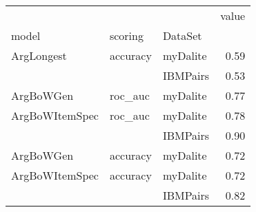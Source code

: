 \begin{tabular}{lllr}
\toprule
               &          &          &  value \\
model & scoring & DataSet &        \\
\midrule
ArgLongest & accuracy & myDalite &   0.59 \\
               &          & IBMPairs &   0.53 \\
ArgBoWGen & roc\_auc & myDalite &   0.77 \\
ArgBoWItemSpec & roc\_auc & myDalite &   0.78 \\
               &          & IBMPairs &   0.90 \\
ArgBoWGen & accuracy & myDalite &   0.72 \\
ArgBoWItemSpec & accuracy & myDalite &   0.72 \\
               &          & IBMPairs &   0.82 \\
\bottomrule
\end{tabular}
